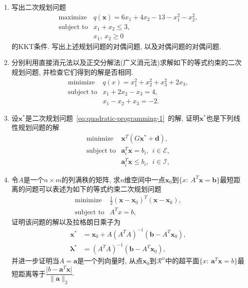 \documentclass{SBCbookchapter}
\newcommand{\V}[1]{{\bm{#1}}}
\newcommand{\R}{\mathcal{R}}
\numberwithin{equation}{section}
\begin{document}
\begin{enumerate}

\item 写出二次规划问题
\begin{equation*}
\begin{array}{cl}
\text{maximize} & q(\V{x}) = 6x_1 + 4x_2 - 13 - x_1^2 - x_2^2, \\
\text{subject to} & x_1 + x_2 \leqslant 3, \\
& x_1, ~ x_2 \geqslant 0
\end{array}
\end{equation*}
的KKT条件. 写出上述规划问题的对偶问题, 以及对偶问题的对偶问题.

\item 分别利用直接消元法以及正交分解法(广义消元法)求解如下的等式约束的二次规划问题, 并检查它们得到的解是否相同.
\begin{equation*}
\begin{array}{cl}
\text{minimize} & q(x) = x_1^2 + x_2^2 + x_3^2 + 2x_3, \\
\text{subject to} & x_1 + 2x_2 - x_3 = 4, \\
& x_1 - x_2 + x_3 = -2.
\end{array}
\end{equation*}

\item 设$\V{x}^*$是二次规划问题~\eqref{eq:quadratic-programming-1}~的解, 证明$\V{x}^*$也是下列线性规划问题的解
\begin{equation*}
\begin{array}{cl}
\text{minimize} & \V{x}^T \left( G \V{x}^* + \V{d} \right), \\
\text{subject to} & \V{a}_i^T \V{x} = b_i, ~~ i \in \mathcal{E}, \\
& \V{a}_i^T \V{x} \leqslant b_i, ~~ i \in \mathcal{I},
\end{array}
\end{equation*}

\item 令$A$是一个$n \times m$的列满秩的矩阵, 求$n$维空间中一点$\V{x}_0$到$\{ x : ~ A^T \V{x} = \V{b} \}$最短距离的问题可以表述为如下的等式约束二次规划问题
\begin{equation*}
\begin{array}{cl}
\text{minimize} & \frac{1}{2} \left( \V{x} - \V{x}_0 \right)^T \left( \V{x} - \V{x}_0 \right), \\
\text{subject to} & A^T x = b,
\end{array}
\end{equation*}
证明该问题的解以及拉格朗日乘子为
\begin{equation*}
\begin{aligned}
\V{x}^* & = \V{x}_0 + A \left( A^T A \right)^{-1} \left( \V{b} - A^T \V{x}_0 \right), \\
\V{\lambda}^* & = \left( A^T A \right)^{-1} \left( \V{b} - A^T \V{x}_0 \right),
\end{aligned}
\end{equation*}
并进一步证明当$A = \V{a}$是一个列向量时, 从点$\V{x}_0$到$\R^n$中的超平面$\{ x : ~ \V{a}^T \V{x} = b \}$最短距离等于$\dfrac{\lvert b - \V{a}^T \V{x} \rvert}{\lVert \V{a} \rVert_2}.$


\end{enumerate}
\end{document}
